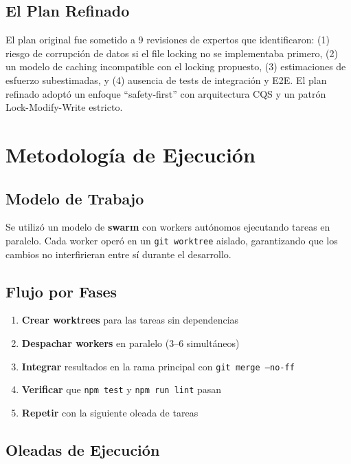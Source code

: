\documentclass[12pt,a4paper]{article}
\begin{document}
\subsection{El Plan Refinado}
El plan original fue sometido a 9 revisiones de expertos que identificaron: (1) riesgo de corrupci\'on de datos si el file locking no se implementaba primero, (2) un modelo de caching incompatible con el locking propuesto, (3) estimaciones de esfuerzo subestimadas, y (4) ausencia de tests de integraci\'on y E2E. El plan refinado adopt\'o un enfoque ``safety-first'' con arquitectura CQS y un patr\'on Lock-Modify-Write estricto.

\section{Metodolog\'ia de Ejecuci\'on}

\subsection{Modelo de Trabajo}
Se utiliz\'o un modelo de \textbf{swarm} con workers aut\'onomos ejecutando tareas en paralelo. Cada worker oper\'o en un \texttt{git worktree} aislado, garantizando que los cambios no interfirieran entre s\'i durante el desarrollo.

\subsection{Flujo por Fases}
\begin{enumerate}
    \item \textbf{Crear worktrees} para las tareas sin dependencias
    \item \textbf{Despachar workers} en paralelo (3--6 simult\'aneos)
    \item \textbf{Integrar} resultados en la rama principal con \texttt{git merge --no-ff}
    \item \textbf{Verificar} que \texttt{npm test} y \texttt{npm run lint} pasan
    \item \textbf{Repetir} con la siguiente oleada de tareas
\end{enumerate}

\subsection{Oleadas de Ejecuci\'on}
\end{document}
